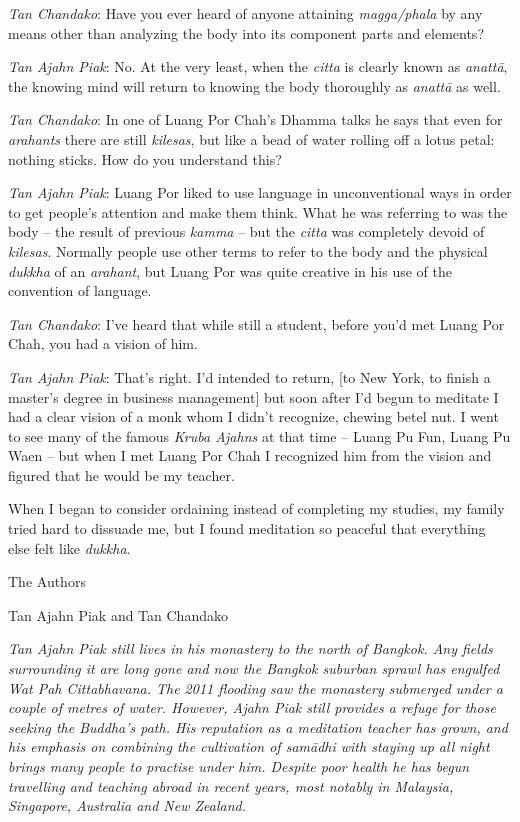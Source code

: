 \emph{Tan Chandako}: Have you ever heard of anyone attaining
\emph{magga/phala} by any means other than analyzing the body into its
component parts and elements? 

\emph{Tan Ajahn Piak}: No. At the very least, when the \emph{citta} is
clearly known as \emph{anattā}, the knowing mind will return to knowing
the body thoroughly as \emph{anattā} as well. 

\emph{Tan Chandako}: In one of Luang Por Chah's Dhamma talks he says
that even for \emph{arahants} there are still \emph{kilesas}, but like a
bead of water rolling off a lotus petal: nothing sticks. How do you
understand this? 

\emph{Tan Ajahn Piak}: Luang Por liked to use language in unconventional
ways in order to get people's attention and make them think. What he was
referring to was the body -- the result of previous \emph{kamma} --
but the \emph{citta} was completely devoid of \emph{kilesas}. Normally
people use other terms to refer to the body and the physical
\emph{dukkha} of an \emph{arahant}, but Luang Por was quite creative in
his use of the convention of language. 

\emph{Tan Chandako}: I've heard that while still a student, before you'd
met Luang Por Chah, you had a vision of him. 

\emph{Tan Ajahn Piak}: That's right. I'd intended to return, {[}to New
York, to finish a master's degree in business management{]} but soon
after I'd begun to meditate I had a clear vision of a monk whom I didn't
recognize, chewing betel nut. I went to see many of the famous
\emph{Kruba Ajahns} at that time -- Luang Pu Fun, Luang Pu Waen --
but when I met Luang Por Chah I recognized him from the vision and
figured that he would be my teacher. 

When I began to consider ordaining instead of completing my studies, my
family tried hard to dissuade me, but I found meditation so peaceful
that everything else felt like \emph{dukkha}. 



The Authors

Tan Ajahn Piak and Tan Chandako

\emph{Tan Ajahn Piak still lives in his monastery to the north of
Bangkok. Any fields surrounding it are long gone and now the Bangkok
suburban sprawl has engulfed Wat Pah Cittabhavana. The 2011 flooding saw
the monastery submerged under a couple of metres of water. However, 
Ajahn Piak still provides a refuge for those seeking the Buddha's path. 
His reputation as a meditation teacher has grown, and his emphasis on
combining the cultivation of samādhi with staying up all night brings
many people to practise under him. Despite poor health he has begun
travelling and teaching abroad in recent years, most notably in
Malaysia, Singapore, Australia and New Zealand.}

